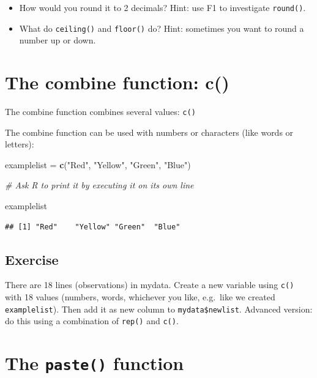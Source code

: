 \documentclass[12pt,]{krantz}
\makeatletter
\newenvironment{Shaded}{\begin{snugshade}}{\end{snugshade}}
\newcommand{\CommentTok}[1]{\textcolor[rgb]{0.56,0.35,0.01}{\textit{#1}}}
\newcommand{\KeywordTok}[1]{\textcolor[rgb]{0.13,0.29,0.53}{\textbf{#1}}}
\newcommand{\NormalTok}[1]{#1}
\newcommand{\StringTok}[1]{\textcolor[rgb]{0.31,0.60,0.02}{#1}}
\newenvironment{kframe}{%
\medskip{}
\setlength{\fboxsep}{.8em}
 \def\at@end@of@kframe{}%
 \ifinner\ifhmode%
  \def\at@end@of@kframe{\end{minipage}}%
  \begin{minipage}{\columnwidth}%
 \fi\fi%
 \def\FrameCommand##1{\hskip\@totalleftmargin \hskip-\fboxsep
 \colorbox{shadecolor}{##1}\hskip-\fboxsep
     \hskip-\linewidth \hskip-\@totalleftmargin \hskip\columnwidth}%
 \MakeFramed {\advance\hsize-\width
   \@totalleftmargin\z@ \linewidth\hsize
   \@setminipage}}%
 {\par\unskip\endMakeFramed%
 \at@end@of@kframe}
\renewenvironment{Shaded}{\begin{kframe}}{\end{kframe}}
\theoremstyle{definition}
\theoremstyle{definition}
\theoremstyle{definition}
\theoremstyle{remark}
\makeatother
\begin{document}
\begin{itemize}
\item
  How would you round it to 2 decimals? Hint: use F1 to investigate
  \texttt{round()}.
\item
  What do \texttt{ceiling()} and \texttt{floor()} do? Hint: sometimes
  you want to round a number up or down.
\end{itemize}

\hypertarget{the-combine-function-c}{%
\section{The combine function: c()}\label{the-combine-function-c}}

The combine function combines several values: \texttt{c()}

The combine function can be used with numbers or characters (like words
or letters):

\begin{Shaded}
\begin{Highlighting}[]
\NormalTok{examplelist =}\StringTok{ }\KeywordTok{c}\NormalTok{(}\StringTok{"Red"}\NormalTok{, }\StringTok{"Yellow"}\NormalTok{, }\StringTok{"Green"}\NormalTok{, }\StringTok{"Blue"}\NormalTok{)}

\CommentTok{# Ask R to print it by executing it on its own line}

\NormalTok{examplelist}
\end{Highlighting}
\end{Shaded}

\begin{verbatim}
## [1] "Red"    "Yellow" "Green"  "Blue"
\end{verbatim}

\hypertarget{exercise-6}{%
\subsection{Exercise}\label{exercise-6}}

There are 18 lines (observations) in mydata. Create a new variable using
\texttt{c()} with 18 values (numbers, words, whichever you like,
e.g.~like we created \texttt{examplelist}). Then add it as new column to
\texttt{mydata\$newlist}. Advanced version: do this using a combination
of \texttt{rep()} and \texttt{c()}.

\newpage

\hypertarget{the-paste-function}{%
\section{\texorpdfstring{The \texttt{paste()}
function}{The paste() function}}\label{the-paste-function}}
\end{document}
